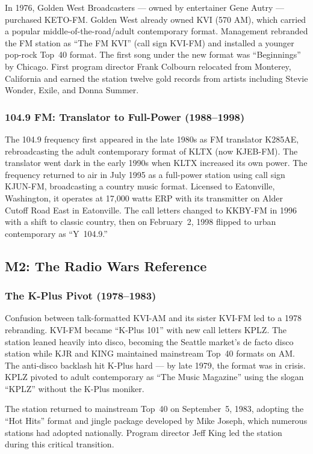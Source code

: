 \documentclass[11pt,letterpaper]{article}
\begin{document}
In 1976, Golden West Broadcasters --- owned by entertainer Gene Autry --- purchased KETO-FM. Golden West already owned KVI (570 AM), which carried a popular middle-of-the-road/adult contemporary format. Management rebranded the FM station as ``The FM KVI'' (call sign KVI-FM) and installed a younger pop-rock Top~40 format. The first song under the new format was ``Beginnings'' by Chicago. First program director Frank Colbourn relocated from Monterey, California and earned the station twelve gold records from artists including Stevie Wonder, Exile, and Donna Summer.

\subsubsection{104.9 FM: Translator to Full-Power (1988--1998)}

The 104.9 frequency first appeared in the late 1980s as FM translator K285AE, rebroadcasting the adult contemporary format of KLTX (now KJEB-FM). The translator went dark in the early 1990s when KLTX increased its own power. The frequency returned to air in July 1995 as a full-power station using call sign KJUN-FM, broadcasting a country music format. Licensed to Eatonville, Washington, it operates at 17,000 watts ERP with its transmitter on Alder Cutoff Road East in Eatonville. The call letters changed to KKBY-FM in 1996 with a shift to classic country, then on February~2, 1998 flipped to urban contemporary as ``Y~104.9.''

\subsection{M2: The Radio Wars Reference}

\subsubsection{The K-Plus Pivot (1978--1983)}

Confusion between talk-formatted KVI-AM and its sister KVI-FM led to a 1978 rebranding. KVI-FM became ``K-Plus 101'' with new call letters KPLZ. The station leaned heavily into disco, becoming the Seattle market's de facto disco station while KJR and KING maintained mainstream Top~40 formats on AM. The anti-disco backlash hit K-Plus hard --- by late 1979, the format was in crisis. KPLZ pivoted to adult contemporary as ``The Music Magazine'' using the slogan ``KPLZ'' without the K-Plus moniker.

The station returned to mainstream Top~40 on September~5, 1983, adopting the ``Hot Hits'' format and jingle package developed by Mike Joseph, which numerous stations had adopted nationally. Program director Jeff King led the station during this critical transition.
\end{document}
